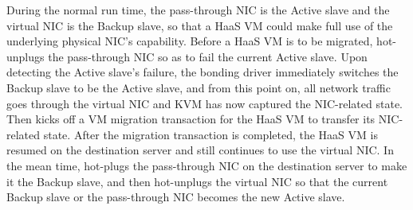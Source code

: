 During the normal run time, the pass-through NIC is the Active slave and the virtual NIC is the Backup slave,
so that a HaaS VM could make full use of the underlying physical NIC's capability.
Before a HaaS VM is to be migrated, \na hot-unplugs the pass-through NIC so as to fail the current Active slave.
Upon detecting the Active slave's failure, the bonding driver immediately switches the Backup slave to be the Active slave,
and from this point on, all network traffic goes through the virtual NIC and KVM has now captured the NIC-related state. Then \na kicks off a VM migration transaction for the HaaS VM to transfer its NIC-related state.
After the migration transaction is completed, the HaaS VM is resumed on the destination server and still continues to use the virtual NIC.
In the mean time, \na hot-plugs the pass-through NIC on the destination  server to make it the Backup slave, and then hot-unplugs the virtual NIC so that the current Backup slave or the pass-through  NIC becomes the new Active slave.


